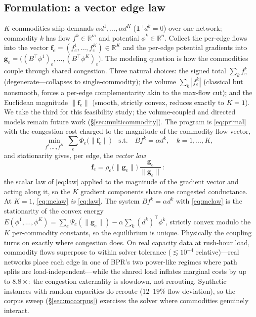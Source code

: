 \documentclass{siamart220329}
\newcommand{\R}{\mathbb{R}}
\begin{document}
\subsection{Formulation: a vector edge law}\label{sec:mcform}
$K$ commodities ship demands $\alpha d^1,\dots,\alpha d^K$ ($\mathbf 1^{\top}d^k=0$) over one
network; commodity $k$ has flow $f^k\in\R^m$ and potential $\phi^k\in\R^n$. Collect the per-edge
flows into the vector $\mathbf f_e=(f^1_e,\dots,f^K_e)\in\R^K$ and the per-edge potential gradients
into $\mathbf g_e=\big((B^{\top}\phi^1)_e,\dots,(B^{\top}\phi^K)_e\big)$. The modeling question is how the commodities couple through shared congestion. Three natural choices:
the signed total $\sum_k f^k_e$ (degenerate---collapses to single-commodity); the volume
$\sum_k|f^k_e|$ (classical but nonsmooth, forces a per-edge complementarity akin to the max-flow
cut); and the Euclidean magnitude $\|\mathbf f_e\|$ (smooth, strictly convex, reduces exactly to
$K=1$). We take the third for this feasibility study; the volume-coupled and directed models remain
future work (\S\ref{sec:multicommodity}). The program is \eqref{eq:primal} with the congestion cost charged to
the magnitude of the commodity-flow vector,
\begin{equation}\label{eq:mcprimal}
\min_{f^1,\dots,f^K}\ \sum_e\Phi_e\big(\|\mathbf f_e\|\big)\quad\text{s.t.}\quad
Bf^k=\alpha d^k,\quad k=1,\dots,K ,
\end{equation}
and stationarity gives, per edge, the \emph{vector law}
\begin{equation}\label{eq:mclaw}
\mathbf f_e=\rho_e\big(\|\mathbf g_e\|\big)\,\frac{\mathbf g_e}{\|\mathbf g_e\|}\,:
\end{equation}
the scalar law of \eqref{eq:law} applied to the magnitude of the gradient vector and acting along
it, so the $K$ gradient components share one congested conductance. At $K=1$, \eqref{eq:mclaw}
\emph{is} \eqref{eq:law}. The system $Bf^k=\alpha d^k$ with \eqref{eq:mclaw} is the stationarity of
the convex energy $E(\phi^1,\dots,\phi^K)=\sum_e\Psi_e(\|\mathbf g_e\|)-\alpha\sum_k(d^k)^{\top}\phi^k$,
strictly convex modulo the $K$ per-commodity constants, so the equilibrium is unique. Physically the coupling turns on exactly where congestion does. On real
capacity data at rush-hour load, commodity flows superpose to within solver tolerance ($\lesssim10^{-4}$ relative)---real networks place
each edge in one of BPR's two power-like regimes where path splits are load-independent---while the
shared load inflates marginal costs by up to $8.8\times$: the congestion externality is slowdown,
not rerouting. Synthetic instances with random capacities do reroute ($12$--$19\%$ flow deviation),
so the corpus sweep (\S\ref{sec:mccorpus}) exercises the solver where commodities genuinely
interact.
\end{document}
